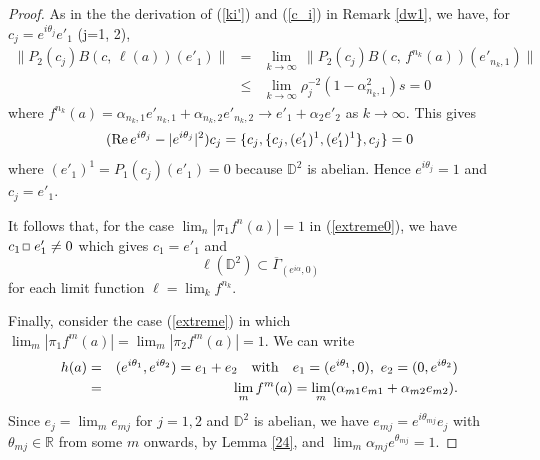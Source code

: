 \documentclass[12pt, twoside]{article}
\def\sqr#1#2{{\,\vcenter{\vbox{\hrule height.#2pt\hbox{\vrule width.#2pt
height#1pt \kern#1pt\vrule width.#2pt}\hrule height.#2pt}}\,}}
\def\bo{\sqr44\,}
\theoremstyle{definition}
\numberwithin{equation}{section}
\begin{document}
\begin{proof}
As in the the derivation of (\ref{ki'}) and (\ref{c_i}) in Remark \ref{dw1}, we have, for $c_j= e^{i\theta_j} e'_1$
(j=1, 2),
\begin{eqnarray}\label{final}
\| P_{2}(c_j) B(c,\,\ell(a))(e'_1)\| &=& \lim_{k\rightarrow \infty} \,\| P_{2}(c_j) B(c,\,f^{n_k}(a))(e'_{n_k,1})\|\nonumber\\
&\leq& \lim_{k\rightarrow \infty} \rho_j^{-2} (1-\alpha_{n_k, 1}^2)s =0
\end{eqnarray}
where $f^{n_k}(a) =\alpha_{n_k,1} e'_{n_k,1} + \alpha_{n_k, 2} e'_{n_k,2} \rightarrow e'_1 + \alpha_2 e'_2$ as $k \rightarrow \infty$.
This gives
 $$({\rm Re}\, e^{i\theta_j} -|e^{i\theta_j}|^2)c_j =\{c_j, \{c_j, (e'_1)^1, (e'_1)^1\}, c_j\}=0$$
where $(e'_1)^1=P_1(c_j)(e'_1)=0$ because $\mathbb{D}^2$ is abelian. Hence $e^{i\theta_j}=1$ and $c_j= e'_1$.


It follows that, for the case  $\lim_n |\pi_1 f^n(a)|=1$ in (\ref{extreme0}), we have $c_1 \bo e'_1 \neq 0$ which
gives $c_1 =e'_1$ and
$$\ell(\mathbb{D}^2) \subset \overline \Gamma_{(e^{i\alpha},0)}$$
for each limit function $\ell= \lim_k f^{n_k}$.

Finally, consider the case (\ref{extreme}) in which $\lim_m |\pi_1 f^m(a)|=\lim_m |\pi_2 f^m(a)|=1$. We can write
\begin{eqnarray*}
h(a) &=& (e^{i\theta_1}, e^{i\theta_2})= e_1 +  e_2 \quad{\rm with} \quad  e_1 =(e^{i\theta_1},0), ~ e_2=(0, e^{i\theta_2}) \\
&=& \lim_m f^m(a) = \lim_m (\alpha_{m1}e_{m1} +\alpha_{m2}e_{m2}).
\end{eqnarray*}
Since $e_j= \lim_m e_{mj}$ for $j=1,2$ and $\mathbb{D}^2$ is abelian, we have $e_{mj}= e^{i\theta_{mj}}e_j$
with $\theta_{mj}\in \mathbb{R}$ from some $m$ onwards, by Lemma \ref{24},
and $\lim_m \alpha_{mj}e^{\theta_{mj}}=1$.


\end{proof}
\end{document}
